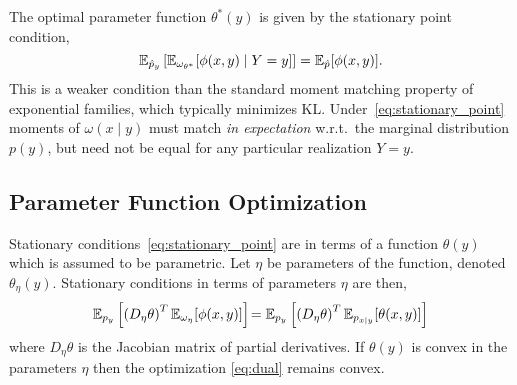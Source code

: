 The optimal parameter function $\theta^{*}(y)$ is given by the
stationary point condition,
\begin{equation}\label{eq:stationary_point}
  \mathbb{E}_{\hat{p}_y}\left[ \mathbb{E}_{\omega_{\theta^{*}}}[ \phi(x,y) \mid Y=y ] \right] = \mathbb{E}_{\hat{p}}[\phi(x,y)].
\end{equation}
This is a weaker condition than the standard moment matching property
of exponential families, which typically minimizes KL.
Under~\eqref{eq:stationary_point} moments of $\omega(x\mid y)$ must
match \emph{in expectation} w.r.t.~the marginal distribution $p(y)$,
but need not be equal for any particular realization $Y=y$.


\subsection{Parameter Function Optimization}

Stationary conditions~\eqref{eq:stationary_point} are in terms of a
function $\theta(y)$ which is assumed to be parametric.  Let $\eta$ be
parameters of the function, denoted $\theta_{\eta}(y)$.  Stationary
conditions in terms of parameters $\eta$ are then,
\begin{equation*}
  \mathbb{E}_{p_y}\left[ \left( D_\eta \theta \right)^T \mathbb{E}_{\omega_\eta}[\phi(x,y)]
    \right]
    \!= \mathbb{E}_{p_y}\left[ \left( D_\eta \theta \right)^T \mathbb{E}_{p_{x\mid
          y}}[ \theta(x,y) ] \right]
\end{equation*}
where $D_\eta \theta$ is the Jacobian matrix of partial derivatives.
If $\theta(y)$ is convex in the parameters $\eta$ then the
optimization \EQN\eqref{eq:dual} remains convex.


